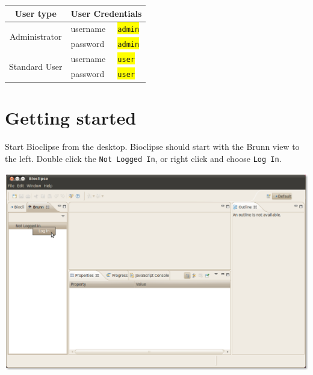\documentclass[12pt, a4paper, twoside, openany]{article}
\begin{document}
    \begin{center}
        \begin{tabular}{|c|l|l|}
            \hline
            User type & \multicolumn{2}{|c|}{User Credentials} \\
            \hline
            \multirow{2}{*}{Administrator} 
                           & username 
                           & \colorbox{yellow}{\texttt{admin}} \\
                           & password 
                           & \colorbox{yellow}{\texttt{admin}} \\
            \hline
            \multirow{2}{*}{Standard User} 
                           & username 
                           & \colorbox{yellow}{\texttt{user}}  \\
                           & password 
                           & \colorbox{yellow}{\texttt{user}}  \\
            \hline
        \end{tabular}
    \end{center}

    \newpage

    \section{Getting started}
    Start Bioclipse from the desktop. Bioclipse should start with the Brunn
    view to the left. Double click the \texttt{Not Logged In}, or right click
    and choose \texttt{Log In}.

    \begin{center}
        \includegraphics[scale=1.2]{images/1.png}
    \end{center}
\end{document}
